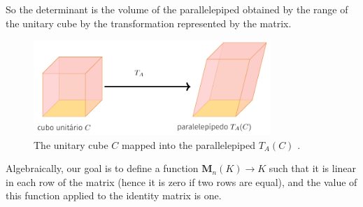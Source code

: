 So the determinant is the volume of the parallelepiped obtained by the range of the unitary cube by the transformation represented by the matrix.

\begin{figure}[h]
	\centering
	  \includegraphics[width=0.8\textwidth]{Figures/geometria_determinante.png} 
	  \caption{The unitary cube $C$ mapped into the parallelepiped $T_A(C)$ \cite{miranda2020avancada}.}
	  \label{fig:geometry-determinant}
\end{figure}

















Algebraically, our goal is to define a function $\textbf{M}_n(K) \longrightarrow K$ such that it is linear in each row of the matrix (hence it is zero if two rows are equal), and the value of this function applied to the identity matrix is one.

